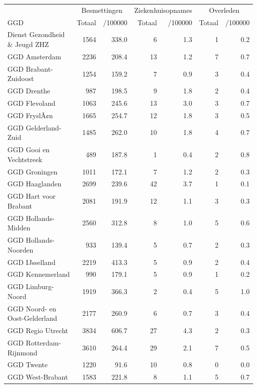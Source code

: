 \documentclass[
  english,
  man,floatsintext]{apa6}
\begin{document}
\begin{table}
\centering\begingroup\fontsize{10}{12}\selectfont

\begin{threeparttable}
\begin{tabular}{lrrrrrr}
\toprule
\multicolumn{1}{c}{ } & \multicolumn{2}{c}{Besmettingen} & \multicolumn{2}{c}{Ziekenhuisopnames} & \multicolumn{2}{c}{Overleden} \\
\cmidrule(l{3pt}r{3pt}){2-3} \cmidrule(l{3pt}r{3pt}){4-5} \cmidrule(l{3pt}r{3pt}){6-7}
GGD & Totaal & /100000 & Totaal & /100000 & Totaal & /100000\\
\midrule
Dienst Gezondheid \& Jeugd ZHZ & 1564 & 338.0 & 6 & 1.3 & 1 & 0.2\\
GGD Amsterdam & 2236 & 208.4 & 13 & 1.2 & 7 & 0.7\\
GGD Brabant-Zuidoost & 1254 & 159.2 & 7 & 0.9 & 3 & 0.4\\
GGD Drenthe & 987 & 198.5 & 9 & 1.8 & 2 & 0.4\\
GGD Flevoland & 1063 & 245.6 & 13 & 3.0 & 3 & 0.7\\
GGD FryslÃ¢n & 1665 & 254.7 & 12 & 1.8 & 3 & 0.5\\
GGD Gelderland-Zuid & 1485 & 262.0 & 10 & 1.8 & 4 & 0.7\\
GGD Gooi en Vechtstreek & 489 & 187.8 & 1 & 0.4 & 2 & 0.8\\
GGD Groningen & 1011 & 172.1 & 7 & 1.2 & 2 & 0.3\\
GGD Haaglanden & 2699 & 239.6 & 42 & 3.7 & 1 & 0.1\\
GGD Hart voor Brabant & 2081 & 191.9 & 12 & 1.1 & 3 & 0.3\\
GGD Hollands-Midden & 2560 & 312.8 & 8 & 1.0 & 5 & 0.6\\
GGD Hollands-Noorden & 933 & 139.4 & 5 & 0.7 & 2 & 0.3\\
GGD IJsselland & 2219 & 413.3 & 5 & 0.9 & 2 & 0.4\\
GGD Kennemerland & 990 & 179.1 & 5 & 0.9 & 1 & 0.2\\
GGD Limburg-Noord & 1919 & 366.3 & 2 & 0.4 & 5 & 1.0\\
GGD Noord- en Oost-Gelderland & 2177 & 260.9 & 6 & 0.7 & 3 & 0.4\\
GGD Regio Utrecht & 3834 & 606.7 & 27 & 4.3 & 2 & 0.3\\
GGD Rotterdam-Rijnmond & 3610 & 264.4 & 29 & 2.1 & 7 & 0.5\\
GGD Twente & 1220 & 91.6 & 10 & 0.8 & 0 & 0.0\\
GGD West-Brabant & 1583 & 221.8 & 8 & 1.1 & 5 & 0.7\\

\end{tabular}
\end{threeparttable}
\end{table}
\end{document}
